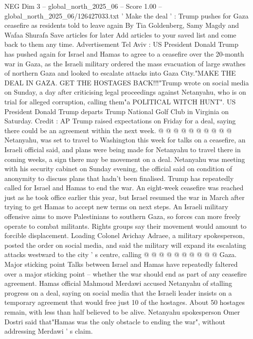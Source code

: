 \begin{textsample}{NEG Dim 3 – global\_north\_2025\_06 – Score 1.00 – global\_north\_2025\_06/126427033.txt}  \label{ex:f3_neg_366}
' Make the deal ' : Trump pushes for Gaza ceasefire as residents told to leave again By Tia Goldenberg, Samy Magdy and Wafaa Shurafa Save articles for later Add articles to your saved list and come back to them any time.
Advertisement Tel Aviv : US President Donald Trump has pushed again for Israel and Hamas to agree to a ceasefire over the 20-month war in Gaza, as the Israeli military ordered the mass evacuation of large swathes of northern Gaza and looked to escalate attacks into Gaza City."MAKE THE DEAL IN GAZA.
GET THE HOSTAGES BACK!!!"Trump wrote on social media on Sunday, a day after criticising legal proceedings against Netanyahu, who is on trial for alleged corruption, calling them"a POLITICAL WITCH HUNT".
US President Donald Trump departs Trump National Golf Club in Virginia on Saturday.
Credit : AP Trump raised expectations on Friday for a deal, saying there could be an agreement within the next week. @ @ @ @ @ @ @ @ @ @ Netanyahu, was set to travel to Washington this week for talks on a ceasefire, an Israeli official said, and plans were being made for Netanyahu to travel there in coming weeks, a sign there may be movement on a deal.
Netanyahu was meeting with his security cabinet on Sunday evening, the official said on condition of anonymity to discuss plans that hadn't been finalised.
Trump has repeatedly called for Israel and Hamas to end the war.
An eight-week ceasefire was reached just as he took office earlier this year, but Israel resumed the war in March after trying to get Hamas to accept new terms on next steps.
An Israeli military offensive aims to move Palestinians to southern Gaza, so forces can more freely operate to combat militants.
Rights groups say their movement would amount to forcible displacement.
Loading Colonel Avichay Adraee, a military spokesperson, posted the order on social media, and said the military will expand its escalating attacks westward to the city ' s centre, calling @ @ @ @ @ @ @ @ @ @ Gaza.
Major sticking point Talks between Israel and Hamas have repeatedly faltered over a major sticking point -- whether the war should end as part of any ceasefire agreement.
Hamas official Mahmoud Merdawi accused Netanyahu of stalling progress on a deal, saying on social media that the Israeli leader insists on a temporary agreement that would free just 10 of the hostages.
About 50 hostages remain, with less than half believed to be alive.
Netanyahu spokesperson Omer Dostri said that"Hamas was the only obstacle to ending the war", without addressing Merdawi ' s claim.

\end{textsample}

